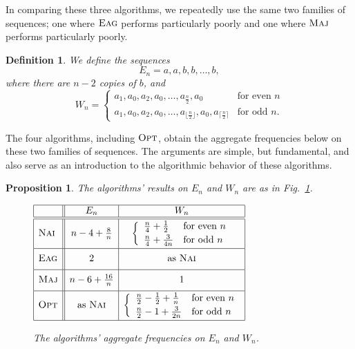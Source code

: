 \documentclass[11pt]{article}
\newtheorem{xdefinition}{Definition}
\newtheorem{xproposition}{Proposition}
\newenvironment{definition}{\begin{xdefinition}\rm}{\hspace*{\fill}\raisebox{-1pt}{\boldmath$\Box$}\end{xdefinition}}
\newenvironment{proposition}{\begin{xproposition}\rm}{\end{xproposition}}
\newcommand{\opt}{{\ensuremath{\textsc{Opt}}}\xspace}
\newcommand{\maj}{{\ensuremath{\textsc{Maj}}}\xspace}
\newcommand{\nav}{{\ensuremath{\textsc{Nai}}}\xspace}
\newcommand{\eag}{{\ensuremath{\textsc{Eag}}}\xspace}
\begin{document}
In comparing these three algorithms, we repeatedly
use the same two families of sequences;
one where \eag performs particularly poorly and one where \maj
performs particularly poorly.

\begin{definition}\label{sequences}
We define the sequences
$$E_n = a,a,b,b,\ldots,b,$$ where there are $n-2$ copies of $b$, and
\[ W_n = \left\{ \begin{array}{ll}
a_1,a_0,a_2,a_0,\ldots, a_{\frac{n}{2}},a_0 & \mbox{for even $n$}\\
a_1,a_0,a_2,a_0,\ldots, a_{\lfloor\frac{n}{2}\rfloor},a_0,
a_{\lceil\frac{n}{2}\rceil} & \mbox{for odd $n$}.
\end{array} \right. \]
\end{definition}

The four algorithms, including \opt,
obtain the aggregate frequencies below on these two families of sequences.
The arguments are simple, but fundamental, and also serve as an
introduction to the algorithmic behavior of these algorithms.
\begin{proposition}\label{prop_sequences}
The algorithms' results on $E_n$ and $W_n$ are as in
Fig.~\ref{fig-profit}.
\begin{figure}[ht]
\begin{center}
$\begin{array}{|l||c|c|} \hline
& E_n & W_n \\ \hline\hline
\rule[-3ex]{0em}{7ex}\nav & n-4+\frac{8}{n} & 
\left\{ \begin{array}{ll}
\frac{n}{4} + \frac{1}{2} & \mbox{for even $n$}\\[.5ex]
\frac{n}{4} + \frac{3}{4n} & \mbox{for odd $n$}
\end{array} \right. \\ \hline
\rule[-2ex]{0em}{5ex}\eag & 2 & \mbox{as \nav} \\ \hline
\rule[-2ex]{0em}{5ex}\maj & n-6+\frac{16}{n} & 1 \\ \hline
\rule[-3ex]{0em}{7ex}\opt & \mbox{as \nav} &
\left\{ \begin{array}{ll}
\frac{n}{2} - \frac{1}{2} + \frac{1}{n} & \mbox{for even $n$}\\[.5ex]
\frac{n}{2} -1 + \frac{3}{2n}  & \mbox{for odd $n$}
\end{array} \right. \\ \hline
\end{array}$
\end{center}
\caption{The algorithms' aggregate frequencies on $E_n$ and $W_n$.}
\label{fig-profit}
\end{figure}
\end{proposition}
\end{document}
